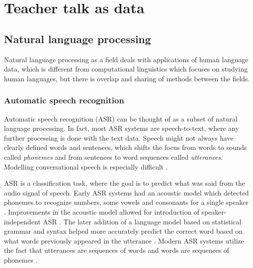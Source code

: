 \documentclass[utf8,english]{gradu3}
\begin{document}
\chapter{Teacher talk as data}
\label{chap:speech}


\section{Natural language processing}

Natural language processing as a field deals with applications of human language data, which is different from computational linguistics which focuses on studying human languages, but there is overlap and sharing of methods between the fields.

\subsection{Automatic speech recognition}
Automatic speech recognition (ASR) can be thought of as a subset of natural language processing. In fact, most ASR systems are speech-to-text, where any further processing is done with the text data. Speech might not always have clearly defined words and sentences, which shifts the focus from words to sounds called \emph{phonemes} and from sentences to word sequences called \emph{utterances}. Modelling conversational speech is especially difficult \parencite{kurimoModelingUnderresourcedLanguages2017}.

ASR is a classification task, where the goal is to predict what was said from the audio signal of speech. Early ASR systems had an acoustic model which detected phonemes to recognize numbers, some vowels and consonants for a single speaker \parencite{juangAutomaticSpeechRecognition2005}. Improvements in the acoustic model allowed for introduction of speaker-independent ASR \parencite{benzeghibaAutomaticSpeechRecognition2007,juangAutomaticSpeechRecognition2005}. The later addition of a language model based on statistical grammar and syntax helped more accurately predict the correct word based on what words previously appeared in the utterance \parencite{juangAutomaticSpeechRecognition2005}. Modern ASR systems utilize the fact that utterances are sequences of words and words are sequences of phonemes \parencite{bengioWordEmbeddingsSpeech2014}. 
\end{document}
